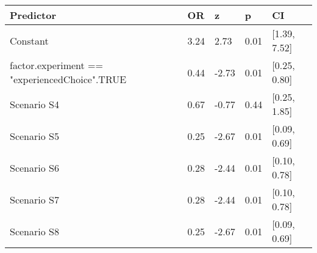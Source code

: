 \begin{tabular}{lllll}
  \toprule
Predictor & OR & z & p & CI \\ 
  \midrule
Constant & 3.24 & 2.73 & 0.01 & [1.39, 7.52] \\ 
  factor.experiment == "experiencedChoice".TRUE & 0.44 & -2.73 & 0.01 & [0.25, 0.80] \\ 
  Scenario S4 & 0.67 & -0.77 & 0.44 & [0.25, 1.85] \\ 
  Scenario S5 & 0.25 & -2.67 & 0.01 & [0.09, 0.69] \\ 
  Scenario S6 & 0.28 & -2.44 & 0.01 & [0.10, 0.78] \\ 
  Scenario S7 & 0.28 & -2.44 & 0.01 & [0.10, 0.78] \\ 
  Scenario S8 & 0.25 & -2.67 & 0.01 & [0.09, 0.69] \\ 
   \bottomrule
\end{tabular}
